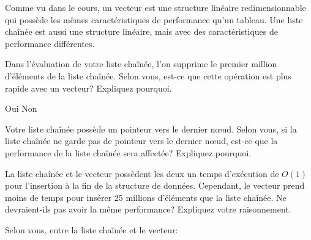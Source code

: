 \documentclass[11pt,addpoints]{exam}
\begin{document}
\begin{questions}

\question[12]
Comme vu dans le cours, un vecteur est une
structure linéaire redimensionnable qui possède les mêmes caractéristiques de
performance qu'un tableau. Une liste chaînée est aussi une structure linéaire, mais avec des caractéristiques de performance différentes.


\question[2]
Dans l'évaluation de votre liste chaînée, l'on supprime le premier million d'éléments de la liste chaînée. Selon vous, est-ce que cette opération est plus rapide avec un vecteur? Expliquez pourquoi.
\begin{oneparcheckboxes}
\choice Oui
\choice Non
\end{oneparcheckboxes}
\newpage

\question[2]
Votre liste chaînée possède un pointeur vers le dernier nœud. Selon vous, si la liste chaînée ne garde pas de pointeur vers le dernier nœud, est-ce que la performance de la liste chaînée sera affectée? Expliquez pourquoi.

\question[2]
La liste chaînée et le vecteur possèdent les deux un temps d'exécution de $O(1)$ pour l'insertion à la fin de la structure de données. Cependant, le vecteur prend moins de temps pour insérer 25 millions d'éléments que la liste chaînée. Ne devraient-ils pas avoir la même performance? Expliquez votre raisonnement.


\question
Selon vous, entre la liste chaînée et le vecteur:
\begin{parts}

\end{parts}
\end{questions}
\end{document}
